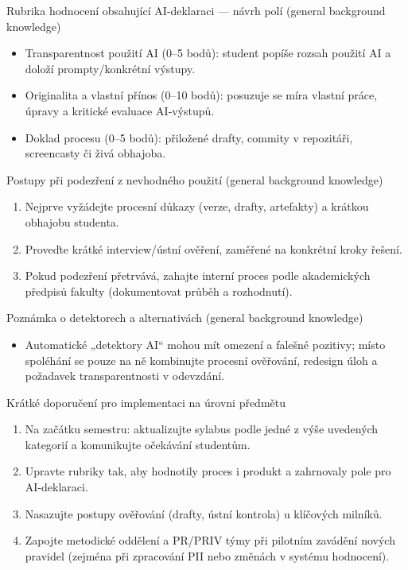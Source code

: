 \documentclass{report}%
\begin{document}
Rubrika hodnocení obsahující AI‑deklaraci — návrh polí (general background knowledge)
\begin{itemize}
  \item Transparentnost použití AI (0–5 bodů): student popíše rozsah použití AI a doloží prompty/konkrétní výstupy.
  \item Originalita a vlastní přínos (0–10 bodů): posuzuje se míra vlastní práce, úpravy a kritické evaluace AI‑výstupů.
  \item Doklad procesu (0–5 bodů): přiložené drafty, commity v repozitáři, screencasty či živá obhajoba.
\end{itemize}

Postupy při podezření z nevhodného použití (general background knowledge)
\begin{enumerate}
  \item Nejprve vyžádejte procesní důkazy (verze, drafty, artefakty) a krátkou obhajobu studenta.
  \item Proveďte krátké interview/ústní ověření, zaměřené na konkrétní kroky řešení.
  \item Pokud podezření přetrvává, zahajte interní proces podle akademických předpisů fakulty (dokumentovat průběh a rozhodnutí).
\end{enumerate}

Poznámka o detektorech a alternativách (general background knowledge)
\begin{itemize}
  \item Automatické „detektory AI“ mohou mít omezení a falešné pozitivy; místo spoléhání se pouze na ně kombinujte procesní ověřování, redesign úloh a požadavek transparentnosti v odevzdání.
\end{itemize}

Krátké doporučení pro implementaci na úrovni předmětu
\begin{enumerate}
  \item Na začátku semestru: aktualizujte sylabus podle jedné z výše uvedených kategorií a komunikujte očekávání studentům.
  \item Upravte rubriky tak, aby hodnotily proces i produkt a zahrnovaly pole pro AI‑deklaraci.
  \item Nasazujte postupy ověřování (drafty, ústní kontrola) u klíčových milníků.
  \item Zapojte metodické oddělení a PR/PRIV týmy při pilotním zavádění nových pravidel (zejména při zpracování PII nebo změnách v systému hodnocení).
\end{enumerate}
\end{document}
